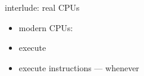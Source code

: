\begin{frame}{interlude: real CPUs}
    \begin{itemize}
    \item modern CPUs:
    \vspace{.5cm}
    \item execute 
    \item execute instructions  --- whenever 
    \end{itemize}
\end{frame}
